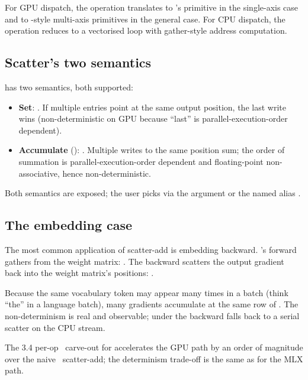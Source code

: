 For GPU dispatch, the operation translates to \MLX's
 primitive in the single-axis case and to
-style multi-axis primitives in the general case.
For CPU dispatch, the operation reduces to a vectorised loop with
gather-style address computation.

\subsection{Scatter's two semantics}
\label{ssec:indexing:scatter_two}

 has two semantics, both supported:

\begin{itemize}
  \item \textbf{Set}: . If multiple
     entries point at the same output position, the
    last write wins (non-deterministic on GPU because ``last'' is
    parallel-execution-order dependent).
  \item \textbf{Accumulate} (): . Multiple writes to the same position sum; the order
    of summation is parallel-execution-order dependent and
    floating-point non-associative, hence non-deterministic.
\end{itemize}

Both semantics are exposed; the user picks via the 
argument or the named alias .

\subsection{The embedding case}
\label{ssec:indexing:embedding_case}

The most common application of scatter-add is embedding backward.
's forward gathers from the weight matrix:
. The backward scatters the
output gradient back into the weight matrix's positions:
.

Because the same vocabulary token may appear many times in a
batch (think ``the'' in a language batch), many gradients
accumulate at the same row of . The non-determinism
is real and observable; under 
the backward falls back to a serial scatter on the CPU stream.

The 3.4 per-op \MPSGraph\ carve-out for
 accelerates the GPU path by an order of
magnitude over the naive \MLX\ scatter-add; the determinism
trade-off is the same as for the MLX path.


